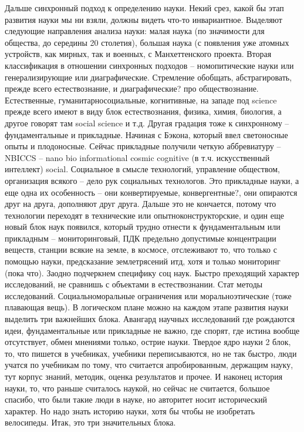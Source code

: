 \documentclass[a4paper, 12pt]{article}
\def\-{\babelhyphen{hard}}
\begin{document}
Дальше синхронный подход к определению науки. Некий срез, какой бы этап 
развития науки мы ни взяли, должны видеть что-то инвариантное. Выделяют 
следующие направления анализа науки: малая наука (по значимости для 
общества, до середины 20 столетия), большая наука (с появления уже 
атомных устройств, как мирных, так и военных, с Манхеттенского проекта. 
Вторая классификация в отношении синхронных подходов -- номопитические 
науки или генерализирующие или диаграфические. Стремление обобщать, 
абстрагировать, прежде всего естествознание, и диаграфические? про 
обществознание. Естественные, гуманитарно\-социальные, когнитивные, на 
западе под science прежде всего имеют в виду блок естествознания, 
физика, химия, биология, а другое говорят там social science и т.д. 
Другая градация тоже к синхронному -- фундаментальные и прикладные. 
Начиная с Бэкона, который ввел светоносные опыты и плодоносные. Сейчас 
прикладные получили четкую аббревиатуру -- NBICCS -- nano bio 
informational cosmic cognitive (в т.ч. искусственный интеллект) social. 
Социальное в смысле технологий, управление обществом, организация 
всякого -- дело рук социальных технологов. Это прикладные науки, а еще 
одна их особенность -- они конвертируемые, конвергентные?, они опираются 
друг на друга, дополняют друг друга. Дальше это не кончается, потому что 
технологии переходят в технические или опытно\-конструкторские, и один 
еще новый блок наук появился, который трудно отнести к фундаментальным 
или прикладным -- мониторинговый, ПДК предельно допустимые концентрации 
веществ, станции всякие на земле, в космосе, отслеживают то, что только 
с помощью науки, предсказание землетрясений итд, хотя и только 
мониторинг (пока что). Заодно подчеркнем специфику соц наук. Быстро 
преходящий характер исследований, не сравнишь с объектами 
в естествознании. Стат методы исследований. Социально\-моральные 
ограничения или морально\-этические (тоже плавающая вещь). В логическом 
плане можно на каждом этапе развития науки выделить три важнейших блока. 
Авангард научных исследований где рождаются идеи, фундаментальные или 
прикладные не важно, где спорят, где истина вообще отсутствует, обмен 
мнениями только, острие науки. Твердое ядро науки 2 блок, то, что 
пишется в учебниках, учебники переписываются, но не так быстро, люди 
учатся по учебникам по тому, что считается апробированным, держащим 
науку, тут корпус знаний, методик, оценка результатов и прочее. 
И наконец история науки, то, что раньше считалось наукой, но сейчас не 
считается, большое спасибо, что были такие люди в науке, но авторитет 
носит исторический характер. Но надо знать историю науки, хотя бы чтобы 
не изобретать велосипеды. Итак, это три значительных блока.
\end{document}
